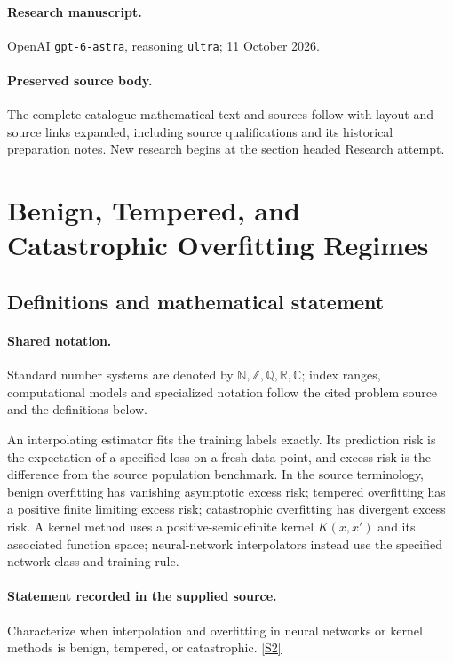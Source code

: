\documentclass[11pt]{article}
\begin{document}
\paragraph{Research manuscript.} OpenAI \texttt{gpt-6-astra}, reasoning \texttt{ultra}; 11 October 2026.
\paragraph{Preserved source body.} The complete catalogue mathematical text and sources follow with layout and source links expanded, including source qualifications and its historical preparation notes. New research begins at the section headed Research attempt.

\section{Benign, Tempered, and Catastrophic Overfitting Regimes}\label{statement}

\subsection{Definitions and mathematical statement}

\paragraph{Shared notation.}Standard number systems are denoted by $\mathbb N,\mathbb Z,\mathbb Q,\mathbb R,\mathbb C$; index ranges, computational models and specialized notation follow the cited problem source and the definitions below.


An interpolating estimator fits the training labels exactly. Its prediction risk is the expectation of a specified loss on a fresh data point, and excess risk is the difference from the source population benchmark. In the source terminology, benign overfitting has vanishing asymptotic excess risk; tempered overfitting has a positive finite limiting excess risk; catastrophic overfitting has divergent excess risk. A kernel method uses a positive-semidefinite kernel $K(x,x')$ and its associated function space; neural-network interpolators instead use the specified network class and training rule.
\paragraph{Statement recorded in the supplied source.}
Characterize when interpolation and overfitting in neural networks or kernel methods is benign, tempered, or catastrophic. \href{https://doi.org/10.4171/owr/2023/41}{[S2]}
\end{document}
